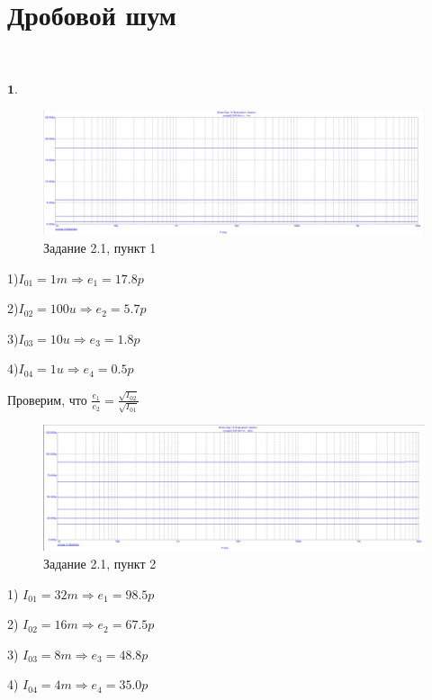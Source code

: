 \documentclass[a4paper, 14pt]{extarticle}%
\begin{document}
\newpage
\newpage

\section{Дробовой шум}

$ $

$\textbf{1.}$

\begin{figure}[h!]
			\centering
			\includegraphics[width=1.1\linewidth]{2.1/pic12.jpg}
			\caption{Задание 2.1, пункт 1}
			\label{A}
\end{figure}


1)$I_{01} = 1m \Rightarrow e_1 = 17.8p$

2)$I_{02} = 100u \Rightarrow e_2 = 5.7p$

3)$I_{03} = 10u \Rightarrow e_3 = 1.8p$

4)$I_{04} = 1u \Rightarrow e_4 = 0.5p$


Проверим, что $\frac{e_1}{e_2} = \frac{\sqrt{I_{02}}}{\sqrt{I_{01}}}$


\begin{figure}[h!]
			\centering
			\includegraphics[width=1.1\linewidth]{2.1/pic11.jpg}
			\caption{Задание 2.1, пункт 2}
			\label{A}
\end{figure}


1) $I_{01} = 32m \Rightarrow e_1 = 98.5p$

2) $I_{02} = 16m \Rightarrow e_2 = 67.5p$

3) $I_{03} = 8m \Rightarrow  e_3 = 48.8p$

4) $I_{04} = 4m \Rightarrow e_4 = 35.0p$
\end{document}
